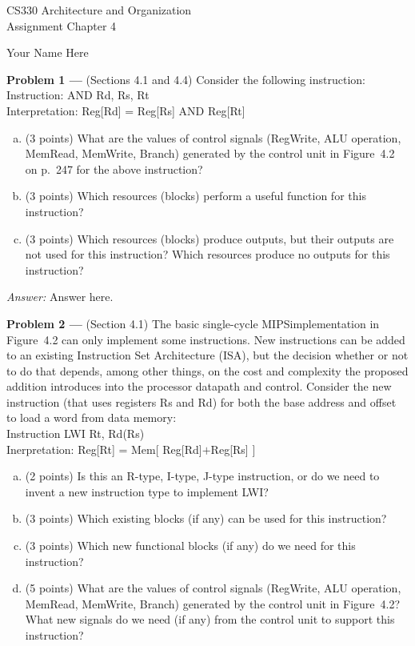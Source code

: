 \documentclass[11pt]{article}
\newcommand{\problem}[1]{\textbf{Problem #1 ---} }
\newcommand{\answer}{{\color{red}\textit{Answer: }}}
\begin{document}
\thispagestyle{empty}

\begin{center}
{\large CS330 Architecture and Organization}\\
Assignment Chapter 4
\end{center}

\begin{flushright}
Your Name Here %
\end{flushright}



\problem{1}(Sections 4.1 and 4.4) Consider the following instruction:\\[6pt]
Instruction: \textsf{AND Rd, Rs, Rt}\\
Interpretation: \textsf{Reg[Rd] = Reg[Rs] AND Reg[Rt]}
\begin{enumerate}[(a)]
    \item(3 points) What are the values of control signals (\textsf{RegWrite, ALU operation, MemRead, MemWrite, Branch}) generated by the control unit in Figure~4.2 on p.~247 for the above instruction?
    \item (3 points) Which resources (blocks) perform a useful function for this instruction?
    \item (3 points) Which resources (blocks) produce outputs, but their outputs are not used for this instruction?  Which resources produce no outputs for this instruction?
\end{enumerate}

\answer
Answer here.

\problem{2}(Section 4.1) The basic single-cycle MIPSimplementation in Figure~4.2 can only implement some instructions.  New instructions can be added to an existing Instruction Set Architecture (ISA), but the decision whether or not to do that depends, among other things, on the cost and complexity the proposed addition introduces into the processor datapath and control.  Consider the new instruction (that uses registers \textsf{Rs} and \textsf{Rd}) for both the base address and offset to load a word from data memory:\\
Instruction \textsf{LWI Rt, Rd(Rs)}\\
Inerpretation: \textsf{Reg[Rt] = Mem[ Reg[Rd]$+$Reg[Rs] ]}
\begin{enumerate}[(a)]
    \item (2 points) Is this an R-type, I-type, J-type instruction, or do we need to invent a new instruction type to implement \textsf{LWI}?
    \item (3 points) Which existing blocks (if any) can be used for this instruction?
    \item (3 points) Which new functional blocks (if any) do we need for this instruction?
    \item (5 points) What are the values of control signals (\textsf{RegWrite, ALU operation, MemRead, MemWrite, Branch}) generated by the control unit in Figure~4.2?  What new signals do we need (if any) from the control unit to support this instruction?
\end{enumerate}
\end{document}
